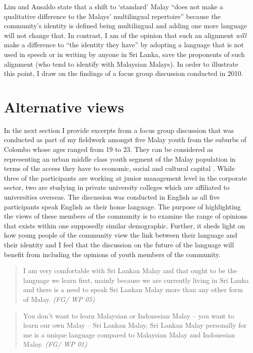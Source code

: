 Lim and Ansaldo state that a shift to `standard' Malay ``does not make a qualitative difference to the Malays' multilingual repertoire'' because the community's identity is defined being multilingual and adding one more language will not change that.  In contrast, I am of the opinion that such an alignment \textit{will} make a difference to ``the identity they have'' by adopting a language that is not used in speech or in writing by anyone in Sri Lanka, save the proponents of such alignment (who tend to identify with Malaysian Malays). In order to illustrate this point, I draw on the findings of a focus group discussion conducted in 2010. 

\section{Alternative views} %

In the next section I provide excerpts from a focus group discussion that was conducted as part of my fieldwork amongst five Malay youth from the suburbs of Colombo whose ages ranged from 19 to 23.  They can be considered as representing an urban middle class youth segment of the Malay population in terms of the access they have to economic, social and cultural capital \citep{Bourdieu1977}. While three of the participants are working at junior management level in the corporate sector, two are studying in private university colleges which are affiliated to universities overseas. The discussion was conducted in English as all five participants speak English as their home language. The purpose of highlighting the views of these members of the community is to examine the range of opinions that exists within one supposedly similar demographic. Further, it sheds light on how young people of the community view the link between their language and their identity and I feel that the discussion on the future of the language will benefit from including the opinions of youth members of the community. 

\begin{quote}
 I am very comfortable with Sri Lankan Malay and that ought to be the language we learn first, mainly because we are currently living in Sri Lanka and there is a need to speak Sri Lankan Malay more than any other form of Malay. 
{\itshape(FG/ WP 05)}
\end{quote}


\begin{quote}
You don't want to learn Malaysian or Indonesian Malay -- you want to learn our own Malay -- Sri Lankan Malay. Sri Lankan Malay personally for me is a unique language compared to Malaysian Malay and Indonesian Malay.
{\itshape
(FG/ WP 01)}
\end{quote}

